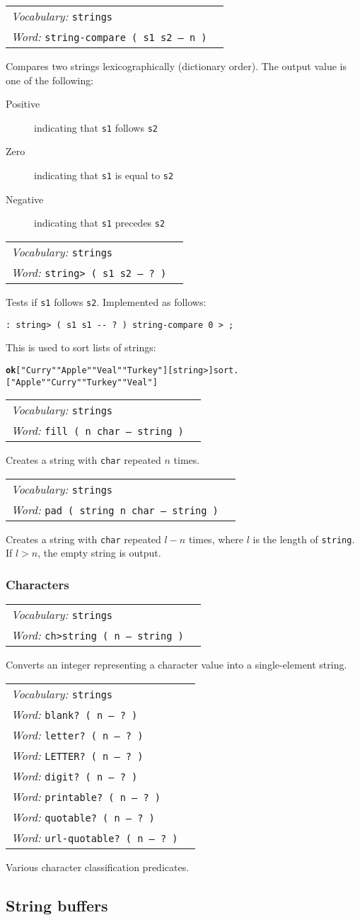 \documentclass{book}
\newcommand{\vocabulary}[1]{\emph{Vocabulary:} \texttt{#1}&\\}
\newcommand{\ordinaryword}[2]{\index{\texttt{#1}}\emph{Word:} \texttt{#2}&\\}
\newcommand{\wordtable}[1]{


\begin{tabularx}{12cm}{lX}
\hline
#1
\hline
\end{tabularx}

}
\begin{document}
\wordtable{
\vocabulary{strings}
\ordinaryword{string-compare}{string-compare~( s1 s2 -- n )}

}
Compares two strings lexicographically (dictionary order). The output value is one of the following:
\begin{description}
\item[Positive] indicating that \texttt{s1} follows \texttt{s2}
\item[Zero] indicating that \texttt{s1} is equal to \texttt{s2}
\item[Negative] indicating that \texttt{s1} precedes \texttt{s2}
\end{description}
\wordtable{
\vocabulary{strings}
\ordinaryword{string>}{string> ( s1 s2 -- ?~)}

}
Tests if \texttt{s1} follows \texttt{s2}. Implemented as follows:
\begin{verbatim}
: string> ( s1 s1 -- ? ) string-compare 0 > ;
\end{verbatim}
This is used to sort lists of strings:
\begin{alltt}
\textbf{ok} [ "Curry" "Apple" "Veal" "Turkey" ] [ string> ] sort .
[ "Apple" "Curry" "Turkey" "Veal" ]
\end{alltt}
\wordtable{
\vocabulary{strings}
\ordinaryword{fill}{fill~( n char -- string )}

}
Creates a string with \texttt{char} repeated $n$ times.
\wordtable{
\vocabulary{strings}
\ordinaryword{pad}{pad~( string n char -- string )}

}
Creates a string with \texttt{char} repeated $l-n$ times, where $l$ is the length of \texttt{string}. If $l>n$, the empty string is output.

\subsubsection{Characters}

\wordtable{
\vocabulary{strings}
\ordinaryword{ch>string}{ch>string ( n -- string )}
}
Converts an integer representing a character value into a single-element string.
\wordtable{
\vocabulary{strings}
\ordinaryword{blank?}{blank?~( n -- ?~)}
\ordinaryword{letter?}{letter?~( n -- ?~)}
\ordinaryword{LETTER?}{LETTER?~( n -- ?~)}
\ordinaryword{digit?}{digit?~( n -- ?~)}
\ordinaryword{printable?}{printable?~( n -- ?~)}
\ordinaryword{quotable?}{quotable?~( n -- ?~)}
\ordinaryword{url-quotable?}{url-quotable?~( n -- ?~)}
}
Various character classification predicates.

\subsection{\label{string-buffers}String buffers}
\end{document}
